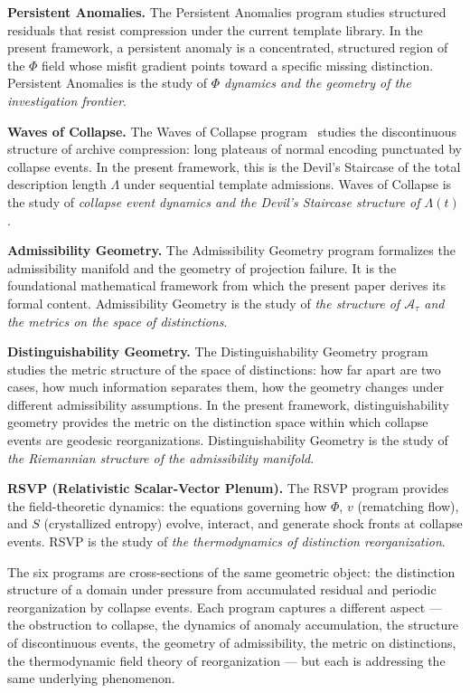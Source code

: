 \documentclass[11pt, a4paper]{article}
\theoremstyle{plain}
\theoremstyle{definition}
\theoremstyle{remark}
\newcommand{\Adm}{\mathcal{A}}
\newcommand{\PhiF}{\varPhi}
\newcommand{\Lam}{\Lambda}
\begin{document}
\medskip
\noindent\textbf{Persistent Anomalies.}
The Persistent Anomalies program studies structured residuals that
resist compression under the current template library.
In the present framework, a persistent anomaly is a concentrated,
structured region of the $\PhiF$ field whose misfit gradient points
toward a specific missing distinction.
Persistent Anomalies is the study of \emph{$\PhiF$ dynamics and
the geometry of the investigation frontier}.

\medskip
\noindent\textbf{Waves of Collapse.}
The Waves of Collapse program~\cite{flyxion2025d} studies the
discontinuous structure of archive compression: long plateaus of
normal encoding punctuated by collapse events.
In the present framework, this is the Devil's Staircase of
the total description length $\Lam$ under sequential template admissions.
Waves of Collapse is the study of \emph{collapse event dynamics and
the Devil's Staircase structure of $\Lam(t)$}.

\medskip
\noindent\textbf{Admissibility Geometry.}
The Admissibility Geometry program formalizes the admissibility
manifold and the geometry of projection failure.
It is the foundational mathematical framework from which the
present paper derives its formal content.
Admissibility Geometry is the study of \emph{the structure of
$\Adm_\tau$ and the metrics on the space of distinctions}.

\medskip
\noindent\textbf{Distinguishability Geometry.}
The Distinguishability Geometry program studies the metric structure
of the space of distinctions: how far apart are two cases, how
much information separates them, how the geometry changes under
different admissibility assumptions.
In the present framework, distinguishability geometry provides
the metric on the distinction space within which collapse events
are geodesic reorganizations.
Distinguishability Geometry is the study of \emph{the Riemannian
structure of the admissibility manifold}.

\medskip
\noindent\textbf{RSVP (Relativistic Scalar-Vector Plenum).}
The RSVP program provides the field-theoretic dynamics:
the equations governing how $\PhiF$, $v$ (rematching flow),
and $S$ (crystallized entropy) evolve, interact, and generate
shock fronts at collapse events.
RSVP is the study of \emph{the thermodynamics of distinction reorganization}.

\medskip
The six programs are cross-sections of the same geometric object:
the distinction structure of a domain under pressure from
accumulated residual and periodic reorganization by collapse events.
Each program captures a different aspect --- the obstruction to
collapse, the dynamics of anomaly accumulation, the structure of
discontinuous events, the geometry of admissibility, the metric
on distinctions, the thermodynamic field theory of reorganization ---
but each is addressing the same underlying phenomenon.
\end{document}
